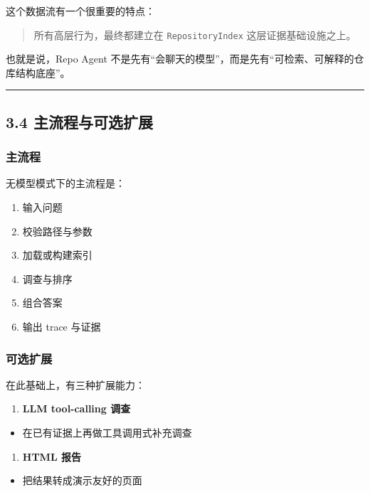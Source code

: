 \documentclass[UTF8,12pt,openany]{ctexbook}
\begin{document}
这个数据流有一个很重要的特点：\par

\begin{quote}
所有高层行为，最终都建立在 \texttt{RepositoryIndex} 这层证据基础设施之上。
\end{quote}

也就是说，Repo Agent 不是先有“会聊天的模型”，而是先有“可检索、可解释的仓库结构底座”。\par

\hrule

\subsection{3.4 主流程与可选扩展}

\subsubsection{主流程}

无模型模式下的主流程是：\par

\begin{enumerate}
\item 输入问题
\item 校验路径与参数
\item 加载或构建索引
\item 调查与排序
\item 组合答案
\item 输出 trace 与证据
\end{enumerate}

\subsubsection{可选扩展}

在此基础上，有三种扩展能力：\par

\begin{enumerate}
\item \textbf{LLM tool-calling 调查}
\end{enumerate}
\begin{itemize}
\item 在已有证据上再做工具调用式补充调查
\end{itemize}

\begin{enumerate}
\item \textbf{HTML 报告}
\end{enumerate}
\begin{itemize}
\item 把结果转成演示友好的页面
\end{itemize}
\end{document}
